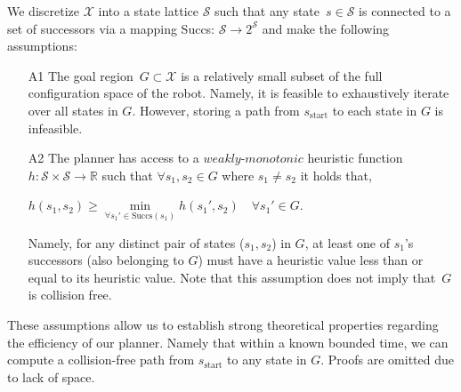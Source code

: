 \documentclass[letterpaper, 10 pt, conference]{ieeeconf}  %
\newcommand{\calX}{\ensuremath{\mathcal{X}}\xspace}
\newcommand{\calS}{\ensuremath{\mathcal{S}}\xspace}
\newcommand{\sStart}{\ensuremath{s_{\text{start}}\xspace}}
\begin{document}
We discretize $\calX$ into a state lattice $\calS$ such that any state~$s \in \calS$ is connected to a set of successors via a mapping Succs: $\calS \rightarrow 2^\calS$ and make the following assumptions:

\begin{enumerate}
  \item[A1] The goal region~$G \subset \calX$ is a relatively small subset of the full configuration space of the robot. Namely, it is feasible to exhaustively iterate over all states in $G$.
However, storing a path from $\sStart$ to each state in $G$ is infeasible.
  
  \item[A2] The planner has access to a $\textit{weakly-monotonic}$ heuristic function $h: \calS \times \calS \rightarrow \mathbb{R}$ such that $\forall s_1, s_2  \in G$ where $s_1 \neq s_2$ it holds that,

  \begin{center}
    $h(s_1, s_2) \geq \min\limits_{\forall s_1' \in \text{Succs}(s_1)} h(s_1', s_2) \quad \forall s_1'\in G $. 
  \end{center}
  Namely, for any distinct pair of states ($s_1, s_2$) in $G$, at least one of $s_1$'s successors (also belonging to $G$) must have a heuristic value less than or equal to its heuristic value. 
	Note that this assumption does not imply  that~$G$ is collision free.
%	
%	
\end{enumerate}

These assumptions allow us to establish strong theoretical properties regarding the efficiency of our planner. Namely that
within a known bounded time, we can compute a collision-free path from $\sStart$ to any state in $G$. Proofs are omitted due to lack of space. 
\end{document}
